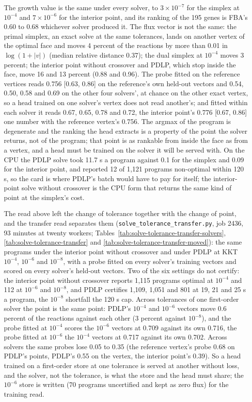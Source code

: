 The growth value is the same under every solver, to $3 \times 10^{-7}$ for the
simplex at $10^{-4}$ and $7 \times 10^{-6}$ for the interior point, and its ranking of
the 195 genes is FBA's 0.60 to 0.68 whichever solver produced it. The flux vector is
not the same: the primal simplex, an exact solve at the same tolerances, lands on
another vertex of the optimal face and moves 4 percent of the reactions by more than
0.01 in $\log(1 + |v|)$ (median relative distance 0.37); the dual simplex at
$10^{-4}$ moves 3 percent; the interior point without crossover and PDLP, which stop
inside the face, move 16 and 13 percent (0.88 and 0.96). The probe fitted on the
reference vertices reads 0.756 [0.63, 0.86] on the reference's own held-out vectors
and 0.54, 0.50, 0.58 and 0.69 on the other four solvers', at chance on the other
exact vertex, so a head trained on one solver's vertex does not read another's; and
fitted within each solver it reads 0.67, 0.65, 0.78 and 0.72, the interior point's
0.776 [0.67, 0.86] one number with the reference vertex's 0.756. The argmax of the
program is degenerate and the ranking the head extracts is a property of the point
the solver returns, not of the program; that point is as rankable from inside the
face as from a vertex, and a head must be trained on the solver it will be served
with. On the CPU the PDLP solve took 11.7 s a program against 0.1 for the simplex and
0.09 for the interior point, and reported 12 of 1,121 programs non-optimal within
120 s, so the card is where PDLP's batch would have to pay for itself; the
interior-point solve without crossover is the CPU form that returns the same kind of
point at the simplex's cost.

The read above left the change of tolerance together with the change of point, and
the transfer read separates them (\texttt{solve\_tolerance\_transfer.py}, job 2436, 93
minutes at twenty workers; Tables~\ref{tab:solve-tolerance-transfer-solvers},
\ref{tab:solve-tolerance-transfer} and \ref{tab:solve-tolerance-transfer-moved}): the
same programs under the interior point without crossover and under PDLP at KKT
$10^{-4}$, $10^{-6}$ and $10^{-8}$, with a probe fitted on every solver's training
vectors and scored on every solver's held-out vectors. Two of the six settings do not
certify: the interior point without crossover reports 1,115 programs optimal at
$10^{-4}$ and 112 at $10^{-6}$ and $10^{-8}$, and PDLP certifies 1,109, 1,051 and 801
at 19, 21 and 25 s a program, the $10^{-8}$ shortfall the 120 s cap. Across
tolerances of one first-order solver the point is the same point: PDLP's $10^{-4}$
and $10^{-6}$ vectors move 0.6 percent of the reactions against each other (3 percent
against $10^{-8}$), and the probe fitted at $10^{-4}$ scores the $10^{-6}$ vectors at
0.709 against its own 0.716, the probe fitted at $10^{-6}$ the $10^{-4}$ vectors at
0.717 against its own 0.702. Across solvers the same probes lose 0.05 to 0.35 (the
reference vertex's probe 0.68 on PDLP's points, PDLP's 0.55 on the vertex, the
interior point's 0.39). So a head trained on a first-order store at one tolerance is
served at another without loss, and the solver, not the tolerance, is what the store
and the head must share; the $10^{-6}$ store is written (70 programs uncertified and
kept as zero flux) for the training read.

